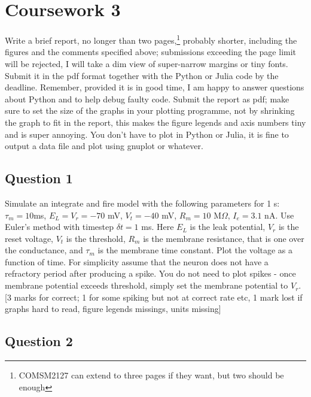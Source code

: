 \documentclass[12pt]{article}
\begin{document}
\section*{Coursework 3}

Write a brief report, no longer than two pages,\footnote{COMSM2127 can extend to three pages if they want, but two should be enough} probably shorter,
including the figures and the comments specified above; submissions
exceeding the page limit will be rejected, I will take a dim view of
super-narrow margins or tiny fonts. Submit it in the pdf format
together with the Python or Julia code by the deadline. Remember,
provided it is in good time, I am happy to answer questions about
Python and to help debug faulty code. Submit the report as pdf; make
sure to set the size of the graphs in your plotting programme, not by
shrinking the graph to fit in the report, this makes the figure
legends and axis numbers tiny and is super annoying. You don't have to
plot in Python or Julia, it is fine to output a data file and plot
using gnuplot or whatever.

\subsection*{Question 1}

Simulate an integrate and fire model with the following parameters for
1 s: $\tau_m = 10 $ms, $E_L = V_r = -70$ mV, $V_t = -40$ mV, $R_m= 10$
M$\Omega$, $I_e = 3.1 $ nA. Use Euler's method with timestep $\delta t
= 1$ ms. Here $E_L$ is the leak potential, $V_r$ is the reset voltage,
$V_t$ is the threshold, $R_m$ is the membrane resistance, that is one
over the conductance, and $\tau_m$ is the membrane time constant. Plot
the voltage as a function of time. For simplicity assume that the
neuron does not have a refractory period after producing a spike. You
do not need to plot spikes - once membrane potential exceeds
threshold, simply set the membrane potential to $V_r$. [3 marks for
  correct; 1 for some spiking but not at correct rate etc, 1 mark lost
  if graphs hard to read, figure legends missings, units missing]

\subsection*{Question 2}
\end{document}
